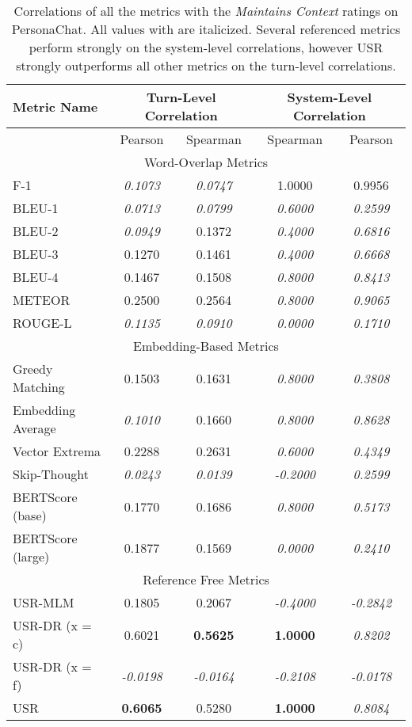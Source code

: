 \documentclass[11pt,a4paper]{article}
\begin{document}
\begin{table*}
    \centering
    \renewcommand*{\arraystretch}{1.2}
    \begin{tabular}{|l|c|c|c|c|}
    \hline
        \textbf{Metric Name} & \multicolumn{2}{|c|}{\textbf{Turn-Level Correlation}} & \multicolumn{2}{|c|}{\textbf{System-Level Correlation}}  \\ \hline
         & Pearson & Spearman & Spearman & Pearson \\ \hline
         \multicolumn{5}{|c|}{Word-Overlap Metrics} \\ \hline
F-1 & \textit{0.1073} & \textit{0.0747} & 1.0000 & 0.9956 \\
BLEU-1 & \textit{0.0713} & \textit{0.0799} & \textit{0.6000} & \textit{0.2599} \\
BLEU-2 & \textit{0.0949} & 0.1372 & \textit{0.4000} & \textit{0.6816} \\
BLEU-3 & 0.1270 & 0.1461 & \textit{0.4000} & \textit{0.6668} \\
BLEU-4 & 0.1467 & 0.1508 & \textit{0.8000} & \textit{0.8413} \\
METEOR & 0.2500 & 0.2564 & \textit{0.8000} & \textit{0.9065} \\
ROUGE-L & \textit{0.1135} & \textit{0.0910} & \textit{0.0000} & \textit{0.1710} \\\hline 
 \multicolumn{5}{|c|}{Embedding-Based Metrics} \\ \hline
Greedy Matching & 0.1503 & 0.1631 & \textit{0.8000} & \textit{0.3808} \\
Embedding Average & \textit{0.1010} & 0.1660 & \textit{0.8000} & \textit{0.8628} \\
Vector Extrema & 0.2288 & 0.2631 & \textit{0.6000} & \textit{0.4349} \\
Skip-Thought & \textit{0.0243} & \textit{0.0139} & \textit{-0.2000} & \textit{0.2599} \\
BERTScore (base) & 0.1770 & 0.1686 & \textit{0.8000} & \textit{0.5173} \\
BERTScore (large) & 0.1877 & 0.1569 & \textit{0.0000} & \textit{0.2410} \\\hline 
 \multicolumn{5}{|c|}{Reference Free Metrics} \\ \hline
USR-MLM & 0.1805 & 0.2067 & \textit{-0.4000} & \textit{-0.2842} \\
USR-DR (x = c) & 0.6021 & \textbf{0.5625} & \textbf{1.0000} & \textit{0.8202} \\
USR-DR (x = f) & \textit{-0.0198} & \textit{-0.0164} & \textit{-0.2108} & \textit{-0.0178} \\
USR & \textbf{0.6065} & 0.5280 & \textbf{1.0000} & \textit{0.8084} \\ \hline
    \end{tabular}
    \caption{Correlations of all the metrics with the \textit{Maintains Context} ratings on PersonaChat. All values with  are italicized. Several referenced metrics perform strongly on the system-level correlations, however USR strongly outperforms all other metrics on the turn-level correlations.}
    
\end{table*}
\end{document}
